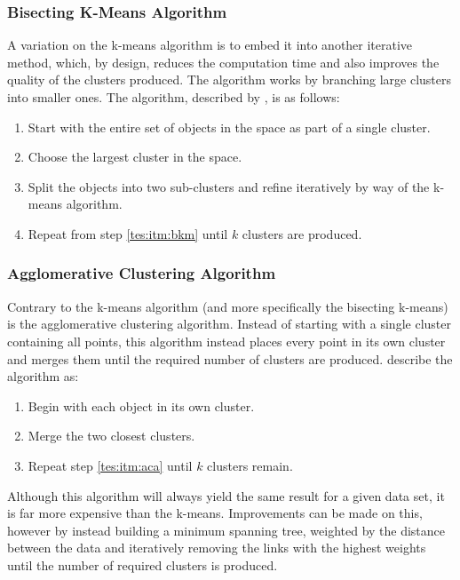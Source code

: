 \subsubsection{Bisecting K-Means Algorithm}\label{tes:ssec:bkma}
A variation on the k-means algorithm is to embed it into another iterative method, which, by design, reduces the computation time and also improves the quality of the clusters produced. The algorithm works by branching large clusters into smaller ones. The algorithm, described by \citet{steinbach2000comparison}, is as follows:
\begin{enumerate}
  \item Start with the entire set of objects in the space as part of a single cluster.
  \item\label{tes:itm:bkm} Choose the largest cluster in the space.
  \item Split the objects into two sub-clusters and refine iteratively by way of the k-means algorithm.
  \item Repeat from step \ref{tes:itm:bkm} until $k$ clusters are produced.
\end{enumerate}
%
\subsubsection{Agglomerative Clustering Algorithm}
Contrary to the k-means algorithm (and more specifically the bisecting k-means) is the agglomerative clustering algorithm. Instead of starting with a single cluster containing all points, this algorithm instead places every point in its own cluster and merges them until the required number of clusters are produced. \citet{way2012advances} describe the algorithm as:
\begin{enumerate}
  \item Begin with each object in its own cluster.
  \item\label{tes:itm:aca} Merge the two closest clusters.
  \item Repeat step \ref{tes:itm:aca} until $k$ clusters remain.
\end{enumerate}
Although this algorithm will always yield the same result for a given data set, it is far more expensive than the k-means. Improvements can be made on this, however by instead building a minimum spanning tree, weighted by the distance between the data and iteratively removing the links with the highest weights until the number of required clusters is produced.
